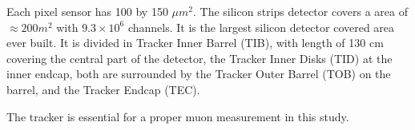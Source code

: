 Each pixel sensor has 100 by 150 $\mu m^2$. The silicon strips detector covers a area of $\approx 200 m^2$ with $9.3 \times 10^6$ channels. It is the largest silicon detector covered area ever built. It is divided in Tracker Inner Barrel (TIB), with length of 130 cm covering the central part of the detector, the Tracker Inner Disks (TID) at the inner endcap, both are surrounded by the Tracker Outer Barrel (TOB) on the barrel, and the Tracker Endcap (TEC).

The tracker is essential for a proper muon measurement in this study.
